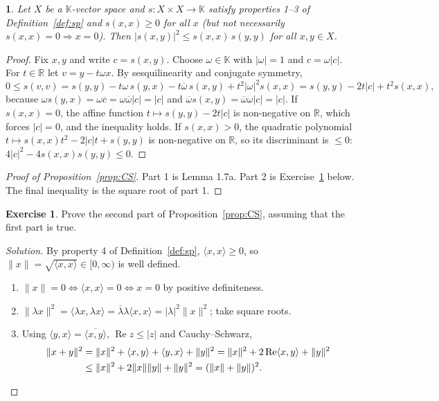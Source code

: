 \documentclass[11pt,a4paper]{article}
\numberwithin{equation}{section}
\newcommand{\R}{\mathbb{R}}
\newcommand{\K}{\mathbb{K}}
\newcommand{\ip}[2]{\langle #1, #2\rangle}
\newcommand{\conj}[1]{\overline{#1}}
\DeclareMathOperator{\Real}{Re}
\theoremstyle{plain}
\theoremstyle{definition}
\newtheorem{exercise}[theorem]{Exercise}
\newcommand{\thistheoremname}{}
\theoremstyle{plain}
\newtheorem*{addedthm*}{\thistheoremname}
\theoremstyle{definition}
\newenvironment{addedthm}[1]{\renewcommand{\thistheoremname}{#1}\begin{addedthm*}}{\end{addedthm*}}
\newenvironment{solution}{\begin{proof}[Solution]}{\end{proof}}
\begin{document}
\begin{addedthm}{Lemma 1.7a (Cauchy--Schwarz for semi-definite forms)}
Let $X$ be a $\K$-vector space and $s:X\times X\to\K$ satisfy properties 1--3 of
Definition~\ref{def:sp} and $s(x,x)\ge0$ for all $x$ (but not necessarily
$s(x,x)=0\Rightarrow x=0$). Then $|s(x,y)|^2\le s(x,x)\,s(y,y)$ for all $x,y\in X$.
\end{addedthm}
\begin{proof}
Fix $x,y$ and write $c=s(x,y)$. Choose $\omega\in\K$ with $|\omega|=1$ and $c=\omega|c|$.
For $t\in\R$ let $v=y-t\omega x$. By sesquilinearity and conjugate symmetry,
\[
0\le s(v,v)=s(y,y)-t\omega\, s(y,x)-t\conj{\omega}\,s(x,y)+t^2|\omega|^2s(x,x)
= s(y,y)-2t|c|+t^2s(x,x),
\]
because $\omega s(y,x)=\omega\conj{c}=\omega\conj{\omega}|c|=|c|$ and
$\conj\omega s(x,y)=\conj\omega\omega|c|=|c|$.
If $s(x,x)=0$, the affine function $t\mapsto s(y,y)-2t|c|$ is non-negative on $\R$, which
forces $|c|=0$, and the inequality holds. If $s(x,x)>0$, the quadratic polynomial
$t\mapsto s(x,x)t^2-2|c|t+s(y,y)$ is non-negative on $\R$, so its discriminant is
$\le0$: $4|c|^2-4s(x,x)s(y,y)\le0$.
\end{proof}

\begin{proof}[Proof of Proposition~\ref{prop:CS}]
Part 1 is Lemma 1.7a. Part 2 is Exercise~\ref{exo:norm} below. The final inequality is the
square root of part 1.
\end{proof}

\begin{exercise}\label{exo:norm}
Prove the second part of Proposition~\ref{prop:CS}, assuming that the first part is true.
\end{exercise}
\begin{solution}
By property 4 of Definition~\ref{def:sp}, $\ip{x}{x}\ge0$, so $\|x\|=\sqrt{\ip{x}{x}}\in[0,\infty)$ is well defined.
\begin{enumerate}
\item $\|x\|=0\iff\ip{x}{x}=0\iff x=0$ by positive definiteness.
\item $\|\lambda x\|^2=\ip{\lambda x}{\lambda x}=\conj\lambda\lambda\ip{x}{x}=|\lambda|^2\|x\|^2$; take square roots.
\item Using $\ip{y}{x}=\conj{\ip{x}{y}}$, $\Real z\le|z|$ and Cauchy--Schwarz,
\begin{align*}
\|x+y\|^2&=\|x\|^2+\ip{x}{y}+\ip{y}{x}+\|y\|^2=\|x\|^2+2\Real\ip{x}{y}+\|y\|^2\\
&\le\|x\|^2+2\|x\|\|y\|+\|y\|^2=(\|x\|+\|y\|)^2 .\qedhere
\end{align*}
\end{enumerate}
\end{solution}
\end{document}
